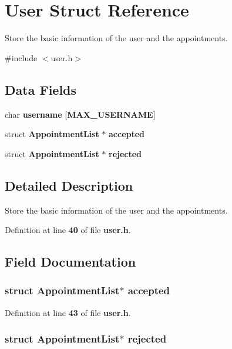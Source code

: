 \section{User Struct Reference}
\label{struct_user}


Store the basic information of the user and the appointments.  




{\ttfamily \#include $<$user.\+h$>$}

\subsection*{Data Fields}
\begin{DoxyCompactItemize}
\item 
char {\bf username} [{\bf M\+A\+X\+\_\+\+U\+S\+E\+R\+N\+A\+M\+E}]
\item 
struct {\bf Appointment\+List} $\ast$ {\bf accepted}
\item 
struct {\bf Appointment\+List} $\ast$ {\bf rejected}
\end{DoxyCompactItemize}


\subsection{Detailed Description}
Store the basic information of the user and the appointments. 

Definition at line {\bf 40} of file {\bf user.\+h}.



\subsection{Field Documentation}
\subsubsection[{accepted}]{\setlength{\rightskip}{0pt plus 5cm}struct {\bf Appointment\+List}$\ast$ accepted}\label{struct_user_ae0ad1da30e04d195e45f919bc254b340}


Definition at line {\bf 43} of file {\bf user.\+h}.

\subsubsection[{rejected}]{\setlength{\rightskip}{0pt plus 5cm}struct {\bf Appointment\+List}$\ast$ rejected}\label{struct_user_a60d127ce8fdd7d91700bbf1f4278506f}


